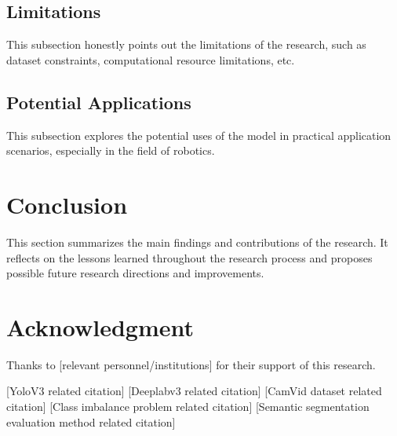 \documentclass[conference]{IEEEtran}
\begin{document}
\subsection{Limitations}
This subsection honestly points out the limitations of the research, such as dataset constraints, computational resource limitations, etc.

\subsection{Potential Applications}
This subsection explores the potential uses of the model in practical application scenarios, especially in the field of robotics.

\section{Conclusion}
This section summarizes the main findings and contributions of the research. It reflects on the lessons learned throughout the research process and proposes possible future research directions and improvements.

\section*{Acknowledgment}
Thanks to [relevant personnel/institutions] for their support of this research.

\begin{thebibliography}{00}
 [YoloV3 related citation]
 [Deeplabv3 related citation]
 [CamVid dataset related citation]
 [Class imbalance problem related citation]
 [Semantic segmentation evaluation method related citation]
\end{thebibliography}
\end{document}
